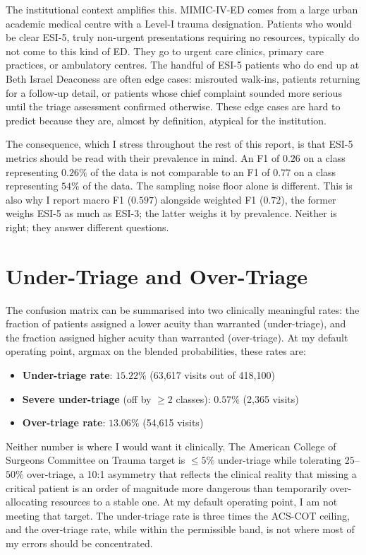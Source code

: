 The institutional context amplifies this. MIMIC-IV-ED comes from a large urban academic medical centre with a Level-I trauma designation. Patients who would be clear ESI-5, truly non-urgent presentations requiring no resources, typically do not come to this kind of ED. They go to urgent care clinics, primary care practices, or ambulatory centres. The handful of ESI-5 patients who do end up at Beth Israel Deaconess are often edge cases: misrouted walk-ins, patients returning for a follow-up detail, or patients whose chief complaint sounded more serious until the triage assessment confirmed otherwise. These edge cases are hard to predict because they are, almost by definition, atypical for the institution.

The consequence, which I stress throughout the rest of this report, is that ESI-5 metrics should be read with their prevalence in mind. An F1 of $0.26$ on a class representing $0.26\%$ of the data is not comparable to an F1 of $0.77$ on a class representing $54\%$ of the data. The sampling noise floor alone is different. This is also why I report macro F1 ($0.597$) alongside weighted F1 ($0.72$), the former weighs ESI-5 as much as ESI-3; the latter weighs it by prevalence. Neither is right; they answer different questions.

\section{Under-Triage and Over-Triage}

The confusion matrix can be summarised into two clinically meaningful rates: the fraction of patients assigned a lower acuity than warranted (under-triage), and the fraction assigned higher acuity than warranted (over-triage). At my default operating point, argmax on the blended probabilities, these rates are:

\begin{itemize}
 \item \textbf{Under-triage rate}: $15.22\%$ (63{,}617 visits out of 418{,}100)
 \item \textbf{Severe under-triage} (off by $\geq 2$ classes): $0.57\%$ (2{,}365 visits)
 \item \textbf{Over-triage rate}: $13.06\%$ (54{,}615 visits)
\end{itemize}

Neither number is where I would want it clinically. The American College of Surgeons Committee on Trauma target is $\leq 5\%$ under-triage while tolerating $25$--$50\%$ over-triage, a 10:1 asymmetry that reflects the clinical reality that missing a critical patient is an order of magnitude more dangerous than temporarily over-allocating resources to a stable one. At my default operating point, I am not meeting that target. The under-triage rate is three times the ACS-COT ceiling, and the over-triage rate, while within the permissible band, is not where most of my errors should be concentrated.


